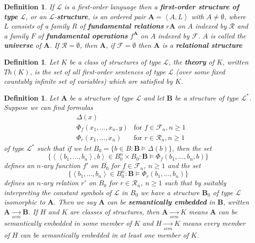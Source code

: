 \documentclass[12pt,a4paper]{article}
\newtheorem{definition}[theorem]{Definition}
\newcommand\CR{\mathcal{R}}
\newcommand\BBB{\mathbf{B}}
\newcommand\FF{\mathcal{F}}
\newcommand\LL{\mathcal{L}}
\begin{document}
\begin{definition}
    If $\LL$ is a first-order language then a \textbf{first-order structure of type} $\LL$, or an $\LL$-\textbf{structure}, is an ordered pair $\mathbf{A}=\left<A,L\right>$ with $A\neq\emptyset$, where $L$ consists of a family $R$ of \textbf{fundamental relations} $r\mathbf{A}$ on $A$ indexed by $\CR$ and a family $F$ of \textbf{fundamental operations} $f^\mathbf{A}$ on $A$ indexed by $\FF$.
    $A$ is called the \textbf{universe} of $\mathbf{A}$.
    If $\CR=\emptyset$, then $\mathbf{A}$, if $\FF=\emptyset$ then $\mathbf{A}$ is a \textbf{relational structure}
\end{definition}

\begin{definition}
    Let $K$ be a class of structures of type $\LL$, the \textbf{theory} of $K$, written $Th(K)$, is the set of all first-order sentences of type $\LL$ (over some fixed countably infinite set of variables) which are satisfied by $K$.
\end{definition}

\begin{definition}
    Let $\mathbf{A}$ be a structure of type $\LL$ and let $\BBB$ be a structure of type $\LL^*$. 
    Suppose we can find formulas
    \begin{align*}
        & \Delta(x)\\
        & \Phi_f(x_1,\ldots,x_n,y) & \text{for } f\in\FF_n,n\ge 1\\
        & \Phi_r(x_1,\ldots,x_n) & \text{for } r\in\CR_n,n\ge 1
    \end{align*}
    of type $\LL^*$ such that if we let $B_0=\{b\in B:\BBB\models\Delta(b)\}$, then the set
    \[
        \{\left<\left<b_1,\ldots,b_n\right>,b\right>\in B_0^n\times B_0:\BBB\models\Phi_f(b_1,\ldots,b_n,b)\}
    \]
    defines an $n$-ary function $f'$ on $B_0$ for $f\in\FF_n$, $n\ge 1$ and the set
    \[
        \{\left<b_1,\ldots,b_n\right>\in B_0^n:\BBB\models\Phi_r(b_1,\ldots,b_n)\}
    \]
    defines an $n$-ary relation $r'$ on $B_0$ for $r\in\CR_n$, $n\ge 1$ such that by suitably interpreting the constant symbols of $\LL$ in $B_0$ we have a structure $\BBB_0$ of type $\LL$ isomorphic to $\mathbf{A}$.
    Then we say $\mathbf{A}$ can be \textbf{semantically embedded} in $\BBB$, written $\mathbf{A}\xrightarrow[sem]{}\mathbf{B}$.
    If $H$ and $K$ are classes of structures, then $\mathbf{A}\xrightarrow[sem]{}K$ means $\mathbf{A}$ can be semantically embedded in some member of $K$ and $H\xrightarrow[sem]{}K$ means every member of $H$ can be semantically embedded in at least one member of $K$.
\end{definition}
\end{document}
